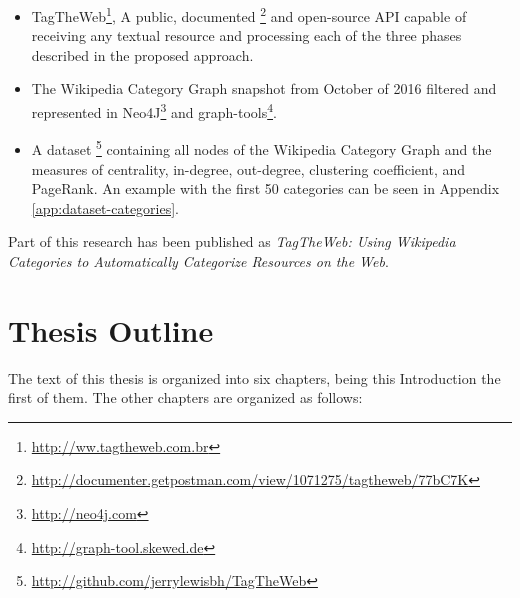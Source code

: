 \begin{itemize}
\item TagTheWeb\footnote{\url{http://ww.tagtheweb.com.br}}, A public, documented \footnote{\url{http://documenter.getpostman.com/view/1071275/tagtheweb/77bC7K}} and open-source API capable of receiving any textual resource and processing each of the three phases described in the proposed approach.

\item  The Wikipedia Category Graph snapshot from October of 2016 filtered and represented in Neo4J\footnote{\url{http://neo4j.com}} and graph-tools\footnote{\url{http://graph-tool.skewed.de}}.  

\item A dataset \footnote {\url{http://github.com/jerrylewisbh/TagTheWeb}} containing all nodes of the Wikipedia Category Graph and the measures of centrality, in-degree, out-degree, clustering coefficient, and PageRank. An example with the first 50 categories can be seen in Appendix \ref{app:dataset-categories}.

\end{itemize}
Part of this research has been published as \textit{TagTheWeb: Using Wikipedia Categories to Automatically Categorize Resources on the Web}\cite{medeiros2018tagtheweb}.

\section{\hspace*{3pt}Thesis Outline}

The text of this thesis is organized into six chapters, being this Introduction the first of them. The other chapters are organized as follows:

